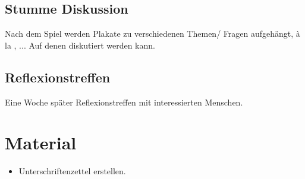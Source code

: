 \documentclass[12pt, a4paper, openany]{report}
\begin{document}
\section{Stumme Diskussion}
Nach dem Spiel werden Plakate zu verschiedenen Themen/ Fragen aufgehängt, à la , ... Auf denen  diskutiert werden kann.

\section{Reflexionstreffen}
Eine Woche später Reflexionstreffen mit interessierten Menschen.

\chapter{Material}
\begin{itemize}
    \item Unterschriftenzettel erstellen.
\end{itemize}

\printbibliography
\listoftodos
\end{document}
